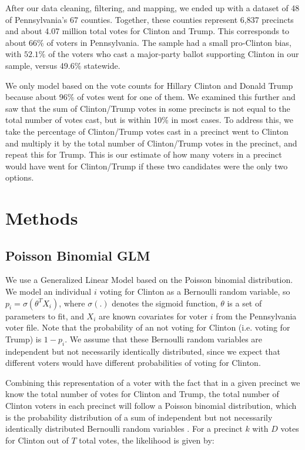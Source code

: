 \documentclass[10pt,twocolumn,letterpaper]{article}
\begin{document}
After our data cleaning, filtering, and mapping, we ended up with a dataset of 48 of Pennsylvania's 67 counties. Together, these counties represent 6,837 precincts and about 4.07 million total votes for Clinton and Trump. This corresponds to about 66\% of voters in Pennsylvania. The sample had a small pro-Clinton bias, with $52.1\%$ of the voters who cast a major-party ballot supporting Clinton in our sample, versus 49.6\% statewide. 

We only model based on the vote counts for Hillary Clinton and Donald Trump because about 96\% of votes went for one of them. We examined this further and saw that the sum of Clinton/Trump votes in some precincts is not equal to the total number of votes cast, but is within 10\% in most cases. To address this, we take the percentage of Clinton/Trump votes cast in a precinct went to Clinton and multiply it by the total number of Clinton/Trump votes in the precinct, and repeat this for Trump. This is our estimate of how many voters in a precinct would have went for Clinton/Trump if these two candidates were the only two options.

\section{Methods}

\subsection{Poisson Binomial GLM}

We use a Generalized Linear Model based on the Poisson binomial distribution. We model an individual $i$ voting for Clinton as a Bernoulli random variable, so $p_i = \sigma(\theta^TX_i)$, where $\sigma(.)$ denotes the sigmoid function, $\theta$ is a set of parameters to fit, and $X_i$ are known covariates for voter $i$ from the Pennsylvania voter file. Note that the probability of an not voting for Clinton (i.e. voting for Trump) is $1 - p_i$. We assume that these Bernoulli random variables are independent but not necessarily identically distributed, since we expect that different voters would have different probabilities of voting for Clinton.

Combining this representation of a voter with the fact that in a given precinct we know the total number of votes for Clinton and Trump, the total number of Clinton voters in each precinct will follow a Poisson binomial distribution, which is the probability distribution of a sum of independent but not necessarily identically distributed Bernoulli random variables \cite{Poibi}. For a precinct $k$ with $D$ votes for Clinton out of $T$ total votes, the likelihood is given by:
\end{document}
